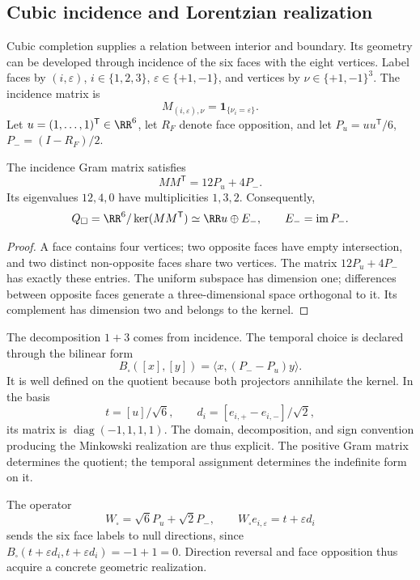 \subsection{Cubic incidence and Lorentzian realization}

Cubic completion supplies a relation between interior and boundary.
Its geometry can be developed through incidence of the six faces with
the eight vertices. Label faces by \((i,\varepsilon)\),
\(i\in\{1,2,3\}\), \(\varepsilon\in\{+1,-1\}\), and vertices by
\(\nu\in\{+1,-1\}^3\). The incidence matrix is
\[
 M_{(i,\varepsilon),\nu}=\mathbf1_{\{\nu_i=\varepsilon\}}.
\]
Let \(u=(1,\ldots,1)^{\mathsf T}\in\RR^6\), let \(R_F\) denote
face opposition, and let \(P_u=uu^{\mathsf T}/6\), \(P_-=(I-R_F)/2\).

\begin{proposition}
The incidence Gram matrix satisfies
\[
 MM^{\mathsf T}=12P_u+4P_-.
\]
Its eigenvalues \(12,4,0\) have multiplicities \(1,3,2\).
Consequently,
\[
 Q_\square=\RR^6/\ker(MM^{\mathsf T})
 \simeq\RR u\oplus E_-,\qquad E_-=\operatorname{im}P_-.
\]
\end{proposition}
\begin{proof}
A face contains four vertices; two opposite faces have empty intersection,
and two distinct non-opposite faces share two vertices.
The matrix \(12P_u+4P_-\) has exactly these entries.
The uniform subspace has dimension one; differences between opposite
faces generate a three-dimensional space orthogonal to it.
Its complement has dimension two and belongs to the kernel.
\end{proof}

The decomposition \(1+3\) comes from incidence. The temporal choice
is declared through the bilinear form
\[
 B_\square([x],[y])=\langle x,(P_--P_u)y\rangle.
\]
It is well defined on the quotient because both projectors annihilate
the kernel. In the basis
\[
 t=[u]/\sqrt6,\qquad
 d_i=[e_{i,+}-e_{i,-}]/\sqrt2,
\]
its matrix is \(\operatorname{diag}(-1,1,1,1)\). The domain,
decomposition, and sign convention producing the Minkowski realization
are thus explicit. The positive Gram matrix determines the quotient;
the temporal assignment determines the indefinite form on it.

The operator
\[
 W_\square=\sqrt6P_u+\sqrt2P_-,\qquad
 W_\square e_{i,\varepsilon}=t+\varepsilon d_i
\]
sends the six face labels to null directions, since
\(B_\square(t+\varepsilon d_i,t+\varepsilon d_i)=-1+1=0\).
Direction reversal and face opposition thus acquire a concrete
geometric realization.

